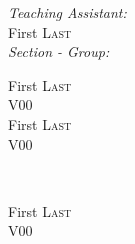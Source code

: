 \documentclass[12pt]{article}
\begin{document}
\begin{titlepage}
%			
%			



			\begin{center}\large
			\emph{Teaching Assistant:}	\\
			First \textsc{Last}	\\	%
			\vspace{1 cm}
			\emph{Section - Group:}	\\	%
			\end{center}

			\begin{minipage}{0.4\textwidth}
			\begin{flushleft} \large
			First \textsc{Last}	\\
			V00	\\
			First \textsc{Last}	\\
			V00	\\
			\end{flushleft}
			\end{minipage}
			~
			\begin{minipage}{0.4\textwidth}
			\begin{flushright} \large
			First \textsc{Last}	\\
			V00	\\
			

\end{flushright}
\end{minipage}
\end{titlepage}
\end{document}
